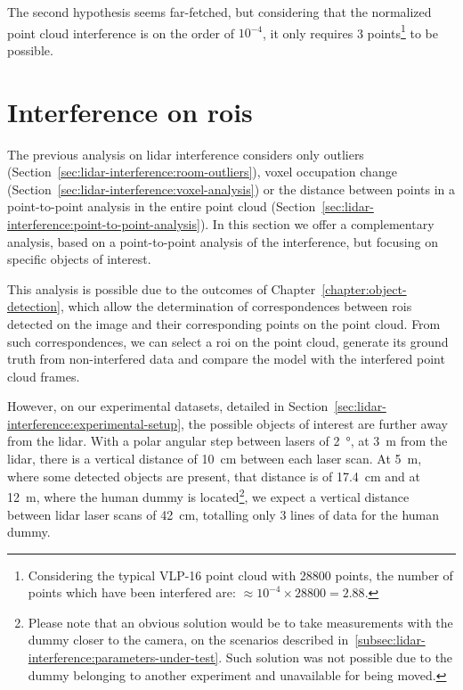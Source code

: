 The second hypothesis seems far-fetched, but considering that the normalized point cloud interference is on the order of $10^{-4}$, it only requires 3 points\footnote{Considering the typical VLP-16 point cloud with 28800 points, the number of points which have been interfered are: $\approx 10^{-4} \times 28800 = 2.88$.} to be possible.




\section{Interference on \acp{roi}}
\label{sec:lidar-interference:interference-roi}
The previous analysis on \ac{lidar} interference considers only outliers (Section~\ref{sec:lidar-interference:room-outliers}), voxel occupation change (Section~\ref{sec:lidar-interference:voxel-analysis}) or the distance between points in a point-to-point analysis in the entire point cloud (Section~\ref{sec:lidar-interference:point-to-point-analysis}). In this section we offer a complementary analysis, based on a point-to-point analysis of the interference, but focusing on specific objects of interest.

This analysis is possible due to the outcomes of Chapter~\ref{chapter:object-detection}, which allow the determination of correspondences between \acp{roi} detected on the image and their corresponding points on the point cloud. From such correspondences, we can select a \ac{roi} on the point cloud, generate its ground truth from non-interfered data and compare the model with the interfered point cloud frames.

However, on our experimental datasets, detailed in Section~\ref{sec:lidar-interference:experimental-setup}, the possible objects of interest are further away from the \ac{lidar}. With a polar angular step between lasers of \SI{2}{\degree}, at \SI{3}{\meter} from the \ac{lidar}, there is a vertical distance of \SI{10}{\centi\meter} between each laser scan. At \SI{5}{\meter}, where some detected objects are present, that distance is of \SI{17.4}{\centi\meter} and at \SI{12}{\meter}, where the human dummy is located\footnote{Please note that an obvious solution would be to take measurements with the dummy closer to the camera, on the scenarios described in~\ref{subsec:lidar-interference:parameters-under-test}. Such solution was not possible due to the dummy belonging to another experiment and unavailable for being moved.}, we expect a vertical distance between \ac{lidar} \ac{laser} scans of \SI{42}{\centi\meter}, totalling only 3 lines of data for the human dummy.

